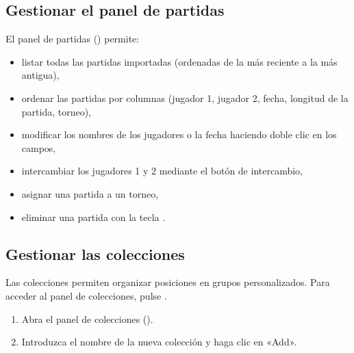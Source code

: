 \documentclass[letterpaper,10pt,spanish]{sphinxmanual}
\begin{document}
\subsection{Gestionar el panel de partidas}
\label{\detokenize{guide_utilisateur:gerer-le-panneau-des-matchs}}
\sphinxAtStartPar
El panel de partidas () permite:
\begin{itemize}
\item {} 
\sphinxAtStartPar
listar todas las partidas importadas (ordenadas de la más reciente a la más antigua),

\item {} 
\sphinxAtStartPar
ordenar las partidas por columnas (jugador 1, jugador 2, fecha, longitud de la partida, torneo),

\item {} 
\sphinxAtStartPar
modificar los nombres de los jugadores o la fecha haciendo doble clic en los campos,

\item {} 
\sphinxAtStartPar
intercambiar los jugadores 1 y 2 mediante el botón de intercambio,

\item {} 
\sphinxAtStartPar
asignar una partida a un torneo,

\item {} 
\sphinxAtStartPar
eliminar una partida con la tecla .

\end{itemize}


\subsection{Gestionar las colecciones}
\label{\detokenize{guide_utilisateur:gerer-les-collections}}
\sphinxAtStartPar
Las colecciones permiten organizar posiciones en grupos personalizados. Para acceder al panel de colecciones, pulse .

\sphinxAtStartPar
{}
\begin{enumerate}
%
\item {} 
\sphinxAtStartPar
Abra el panel de colecciones ().

\item {} 
\sphinxAtStartPar
Introduzca el nombre de la nueva colección y haga clic en «Add».

\end{enumerate}
\end{document}
